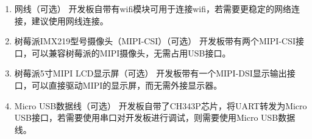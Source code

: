 \begin{enumerate}
\item
  网线（可选）
  开发板自带有wifi模块可用于连接wifi，若需要更稳定的网络连接，建议使用网线连接。
\item
  树莓派IMX219型号摄像头（MIPI-CSI）（可选）
  开发板带有两个MIPI-CSI接口，可以兼容树莓派的MIPI摄像头，无需占用USB接口。
\item
  树莓派5寸MIPI LCD显示屏（可选）
  开发板带有一个MIPI-DSI显示输出接口，可以直接驱动MIPI的显示屏，而无需外接显示器。
\item
  Micro USB数据线（可选） 开发板自带了CH343P芯片，将UART转发为Micro
  USB接口，若需要使用串口对开发板进行调试，则需要使用Micro USB数据线。

\end{enumerate}
